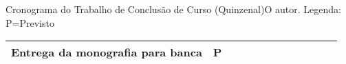 \begin{tabela}{Cronograma do Trabalho de Conclusão de Curso (Quinzenal)}{O autor. Legenda: P=Previsto}
{\begin{tabular}{|cc|ll|ll|ll|ll|ll|}
        \multicolumn{1}{|c|}{Entrega da monografia para banca}                                                                                      & P & \multicolumn{1}{l|}{}                         &                          & \multicolumn{1}{l|}{}                         &                          & \multicolumn{1}{l|}{}                         &                          & \multicolumn{1}{l|}{}                         &                          & \multicolumn{1}{l|}{}                         & \cellcolor[HTML]{3166FF} \\ \hline
    \end{tabular}
    }
\end{tabela}

